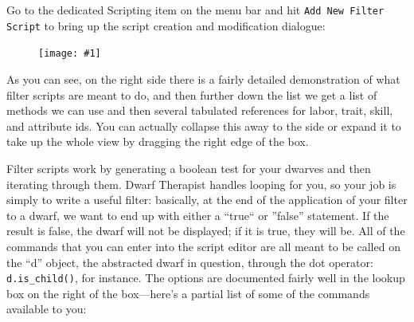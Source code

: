 \documentclass[]{article}
\newcommand{\fullfigure}[1] {
\begin{figure}[h!]
\texttt{[image: \#1]}
\end{figure}
}
\begin{document}
Go to the dedicated Scripting item on the menu bar and hit \texttt{Add New Filter Script} to bring up the
script creation and modification dialogue:

\fullfigure{Sec4Fig1}

As you can see, on the right side there is a fairly detailed demonstration of what filter scripts are
meant to do, and then further down the list we get a list of methods we can use and then several
tabulated references for labor, trait, skill, and attribute ids. You can actually collapse this away to
the side or expand it to take up the whole view by dragging the right edge of the box.

Filter scripts work by generating a boolean test for your dwarves and then iterating through them. Dwarf
Therapist handles looping for you, so your job is simply to write a useful filter: basically, at the end
of the application of your filter to a dwarf, we want to end up with either a ``true`` or ''false''
statement. If the result is false, the dwarf will not be displayed; if it is true, they will be. All of
the commands that you can enter into the script editor are all meant to be called on the ``d'' object, the
abstracted dwarf in question, through the dot operator: \texttt{d.is\_child()}, for instance. The
options are documented fairly well in the lookup box on the right of the box---here's a partial list of
some of the commands available to you:
\vspace{12pt}
\end{document}
